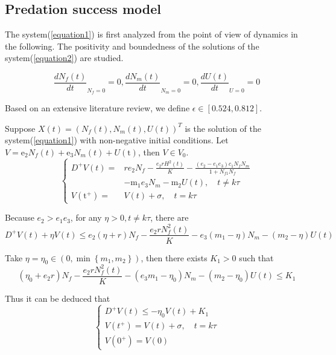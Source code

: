 \documentclass{mcmthesis}
\begin{document}
\subsection{Predation success model}
The system(\ref{equation1}) is first analyzed from the point of view of dynamics in the following.
The positivity and boundedness of the solutions of the system(\ref{equation2}) are studied.

\begin{equation}
  \frac{d N_{f} (t)}{d t}_{N_{f}=0}=0,
  \frac{d N_{m} (t)}{d t}_{N_{m}=0}=0,
  \frac{d U(t)}{d t}_{U=0}=0
\end{equation}

Based on an extensive literature review, we define $\epsilon \in [0.524,0.812]$.

Suppose $X(t)=(N_{f}(t), N_{m}(t), U(t))^{T}$ is the solution of the system(\ref{equation1}) with non-negative initial conditions.
Let $V=\mathrm{e}_{2} N_{f}(t)+\mathrm{e}_{3} N_{m}(t)+U(\mathrm{t})$, then $V \in V_{0}$.
\begin{equation}
  \left\{\begin{aligned}
    D^{+} V(t)=                   & r e_{2} N_{f}-\frac{e_{2} r H^{2}(t)}{K}-\frac{\left(e_{2}-e_{1} e_{3}\right) c_{1} N_{f} N_{m}}{1+N_{f1} N_{f}} \\
                                  & -\mathrm{m}_{1} e_{3} N_{m}-\mathrm{m}_{2} U(t), \quad t \neq k \tau                                             \\
    V\left(\mathrm{t}^{+}\right)= & V(t)+\sigma, \quad t=k \tau
  \end{aligned}\right.
\end{equation}

Because $e_{2}>e_{1} e_{3}$, for any $\eta>0, t \neq k \tau$, there are
\begin{equation}
  D^{+} V(t)+\eta V(t) \leq e_{2}(\eta+r) N_{f}-\frac{e_{2} r N_{f}^{2}(t)}{K}-e_{3}\left(m_{1}-\eta\right) N_{m}-\left(m_{2}-\eta\right) U(t)
\end{equation}

Take $\eta=\eta_{0} \in\left(0, \min \left\{m_{1}, m_{2}\right\}\right)$, then there exists $K_{1}>0$ such that
\begin{equation}
  \left(\eta_{0}+e_{2} r\right) N_{f}-\frac{e_{2} r N_{f}^{2}(t)}{K}-\left(e_{3} m_{1}-\eta_{0}\right) N_{m}-\left(m_{2}-\eta_{0}\right) U(t) \leq K_{1}
\end{equation}

Thus it can be deduced that
\begin{equation}
  \left\{\begin{array}{l}
    D^{+} V(t) \leq-\eta_{0} V(t)+K_{1}             \\
    V\left(t^{+}\right)=V(t)+\sigma, \quad t=k \tau \\
    V\left(0^{+}\right)=V(0)
  \end{array}\right.
\end{equation}
\end{document}
